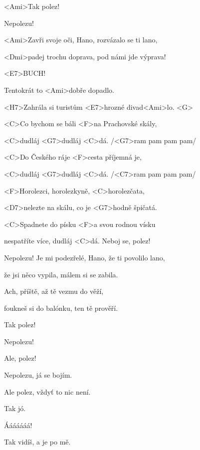 

<Ami>Tak polez!

Nepolezu!

\zs
<Ami>Zavři svoje oči, Hano, rozvázalo se ti lano,

<Dmi>padej trochu doprava, pod námi jde výprava!

<E7>BUCH!

Tentokrát to <Ami>dobře dopadlo.

<H7>Zahrála si turistům <E7>hrozné divad<Ami>lo. <G> \ks

\zr
<C>Co bychom se báli <F>na Prachovské skály,

<C>dudláj <G7>dudláj <C>dá. /<G7>ram pam pam pam/

<C>Do Českého ráje <F>cesta příjemná je,

<C>dudláj <G7>dudláj <C>dá. /<C7>ram pam pam pam/

<F>Horolezci, horolezkyně, <C>horolezčata,

<D7>nelezte na skálu, co je <G7>hodně špičatá.

<C>Spadnete do písku <F>a svou rodnou vísku

nespatříte více, dudláj <C>dá.
\kr
Neboj se, polez!

Nepolezu!
\zs
Je mi podezřelé, Hano, že ti povolilo lano,

že jsi něco vypila, málem si se zabila.

Ach, příště, až tě vezmu do věží,

foukneš si do balónku, ten tě prověří.
\ks

\zr	\kr

Tak polez!

Nepolezu!

Ale, polez!

Nepolezu, já se bojím.

Ale polez, vždyť to nic není.

Tak jó.

Ááááááá!

Tak vidíš, a je po mě.

\kp

